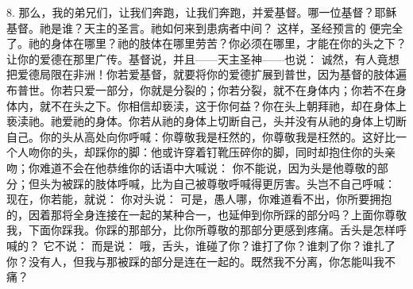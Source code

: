 8. 那么，我的弟兄们，让我们奔跑，让我们奔跑，并爱基督。哪一位基督？耶稣基督。祂是谁？天主的圣言。祂如何来到患病者中间？ 这样，圣经预言的 便完全了。祂的身体在哪里？祂的肢体在哪里劳苦？你必须在哪里，才能在你的头之下？ 让你的爱德在那里广传。基督说，并且——天主圣神——也说： 诚然，有人竟想把爱德局限在非洲！你若爱基督，就要将你的爱德扩展到普世，因为基督的肢体遍布普世。你若只爱一部分，你就是分裂的；你若分裂，就不在身体内；你若不在身体内，就不在头之下。你相信却亵渎，这于你何益？你在头上朝拜祂，却在身体上亵渎祂。祂爱祂的身体。你若从祂的身体上切断自己，头并没有从祂的身体上切断自己。你的头从高处向你呼喊：你尊敬我是枉然的，你尊敬我是枉然的。这好比一个人吻你的头，却踩你的脚：他或许穿着钉靴压碎你的脚，同时却抱住你的头亲吻；你难道不会在他恭维你的话语中大喊说： 你不能说，因为头是他尊敬的部分；但头为被踩的肢体呼喊，比为自己被尊敬呼喊得更厉害。头岂不自己呼喊： 现在，你若能，就说： 你对头说： 可是，愚人哪，你难道看不出，你所要拥抱的，因着那将全身连接在一起的某种合一，也延伸到你所踩的部分吗？上面你尊敬我，下面你踩我。你踩的那部分，比你所尊敬的那部分更感到疼痛。舌头是怎样呼喊的？ 它不说： 而是说： 哦，舌头，谁碰了你？谁打了你？谁刺了你？谁扎了你？没有人，但我与那被踩的部分是连在一起的。既然我不分离，你怎能叫我不痛？\par

